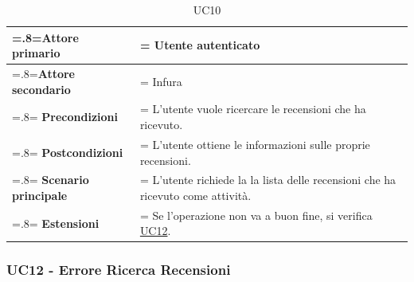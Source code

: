             \begin{table}[H]
                \centering
                \renewcommand{\arraystretch}{1.8}
                \renewcommand\tabularxcolumn[1]{m{#1}}
                \begin{tabularx}{0.9\textwidth} {
                    >{\hsize=.8\hsize\linewidth=\hsize}X
                    >{\hsize=1.2\hsize\linewidth=\hsize}X}
                    \hline
                    \textbf{Attore primario} & Utente autenticato \\
                    \hline
                    \textbf{Attore secondario} & Infura \\
                    \hline
                    \textbf{Precondizioni} & L'utente vuole ricercare le recensioni che ha ricevuto. \\
                    \hline
                    \textbf{Postcondizioni} & L'utente ottiene le informazioni sulle proprie recensioni.\\
                    \hline
                    \textbf{Scenario principale} & L'utente richiede la la lista delle recensioni che ha ricevuto come attività.\\
                    \hline
                    \textbf{Estensioni} & Se l'operazione non va a buon fine, si verifica \hyperref[UC12]{UC12}. \\
                    \hline
                \end{tabularx}
                \caption{UC10}
            \end{table}

        \subsubsection{UC12 - Errore Ricerca Recensioni}
        \label{UC12}

